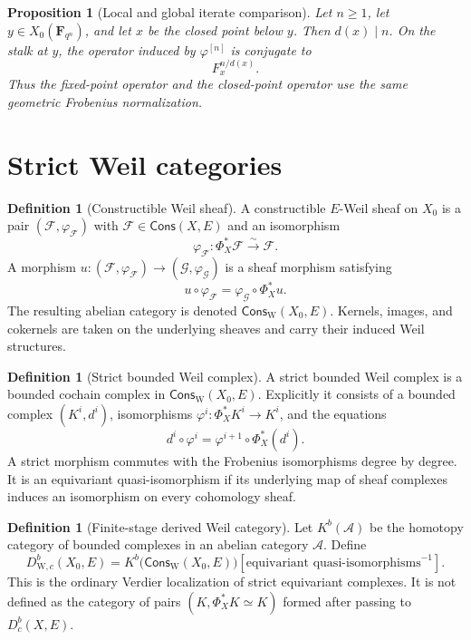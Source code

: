 \documentclass[10pt]{article}
\newtheorem{proposition}[theorem]{Proposition}
\theoremstyle{definition}
\newtheorem{definition}[theorem]{Definition}
\newcommand{\Dbc}{D^b_c}
\newcommand{\WeilD}{D^b_{\mathrm W,c}}
\begin{document}
\begin{proposition}[Local and global iterate comparison]
Let \(n\ge1\), let \(y\in X_0(\mathbf F_{q^n})\), and let \(x\) be the
closed point below \(y\).  Then \(d(x)\mid n\).  On the stalk at \(y\), the
operator induced by \(\varphi^{[n]}\) is conjugate to
\[
                              F_x^{n/d(x)}.
\]
Thus the fixed-point operator and the closed-point operator use the same
geometric Frobenius normalization.
\end{proposition}

\section{Strict Weil categories}

\begin{definition}[Constructible Weil sheaf]
A constructible \(E\)-Weil sheaf on \(X_0\) is a pair
\((\mathcal F,\varphi_{\mathcal F})\) with
\(\mathcal F\in\mathsf{Cons}(X,E)\) and an isomorphism
\[
       \varphi_{\mathcal F}:\Phi_X^*\mathcal F\xrightarrow{\sim}\mathcal F.
\]
A morphism \(u:(\mathcal F,\varphi_{\mathcal F})\to
(\mathcal G,\varphi_{\mathcal G})\) is a sheaf morphism satisfying
\[
 u\circ\varphi_{\mathcal F}
  =\varphi_{\mathcal G}\circ\Phi_X^*u.
\]
The resulting abelian category is denoted
\(\mathsf{Cons}_{\mathrm W}(X_0,E)\).  Kernels, images, and cokernels are
taken on the underlying sheaves and carry their induced Weil structures.
\end{definition}

\begin{definition}[Strict bounded Weil complex]
A strict bounded Weil complex is a bounded cochain complex in
\(\mathsf{Cons}_{\mathrm W}(X_0,E)\).  Explicitly it consists of a bounded
complex \((K^i,d^i)\), isomorphisms
\(\varphi^i:\Phi_X^*K^i\to K^i\), and the equations
\[
          d^i\circ\varphi^i=\varphi^{i+1}\circ\Phi_X^*(d^i).
\]
A strict morphism commutes with the Frobenius isomorphisms degree by degree.
It is an equivariant quasi-isomorphism if its underlying map of sheaf
complexes induces an isomorphism on every cohomology sheaf.
\end{definition}

\begin{definition}[Finite-stage derived Weil category]
Let \(K^b(\mathcal A)\) be the homotopy category of bounded complexes in an
abelian category \(\mathcal A\).  Define
\[
 \WeilD(X_0,E)
 =K^b\bigl(\mathsf{Cons}_{\mathrm W}(X_0,E)\bigr)
   [\text{equivariant quasi-isomorphisms}^{-1}].
\]
This is the ordinary Verdier localization of strict equivariant complexes.
It is not defined as the category of pairs
\((K,\Phi_X^*K\simeq K)\) formed after passing to \(\Dbc(X,E)\).
\end{definition}
\end{document}

